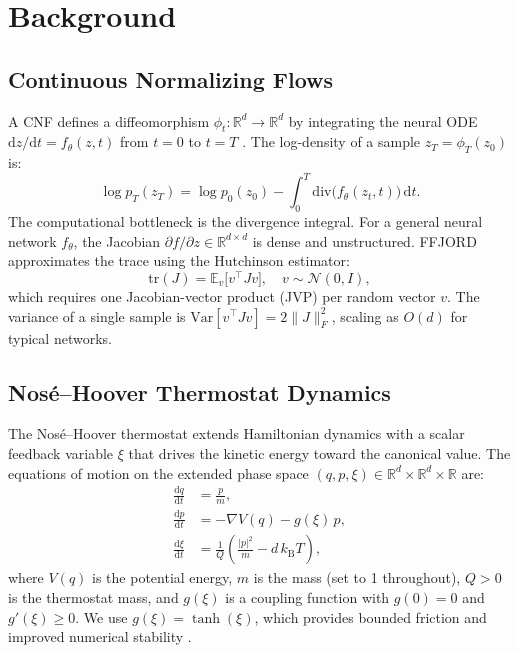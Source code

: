 \documentclass[11pt]{article}
\newcommand{\R}{\mathbb{R}}
\newcommand{\E}{\mathbb{E}}
\newcommand{\Var}{\mathrm{Var}}
\newcommand{\tr}{\mathrm{tr}}
\newcommand{\divergence}{\mathrm{div}}
\newcommand{\dd}{\mathrm{d}}
\newcommand{\kT}{k_{\mathrm{B}}T}
\begin{document}
\section{Background}
\label{sec:background}

\subsection{Continuous Normalizing Flows}
\label{sec:cnf_background}

A CNF defines a diffeomorphism $\phi_t : \R^d \to \R^d$ by integrating the
neural ODE $\dd z/\dd t = f_\theta(z, t)$ from $t=0$ to $t=T$
\citep{chen2018neural}. The log-density of a sample $z_T = \phi_T(z_0)$ is:
\begin{equation}
  \log p_T(z_T) = \log p_0(z_0)
    - \int_0^T \divergence\bigl(f_\theta(z_t, t)\bigr)\, \dd t.
  \label{eq:cnf_logp}
\end{equation}
The computational bottleneck is the divergence integral. For a general neural
network $f_\theta$, the Jacobian $\partial f / \partial z \in \R^{d \times d}$
is dense and unstructured. FFJORD \citep{grathwohl2019ffjord} approximates the
trace using the Hutchinson estimator:
\begin{equation}
  \tr(J) = \E_{v}\bigl[v^\top J v\bigr], \quad v \sim \mathcal{N}(0, I),
  \label{eq:hutchinson}
\end{equation}
which requires one Jacobian-vector product (JVP) per random vector $v$. The
variance of a single sample is $\Var[v^\top J v] = 2\|J\|_F^2$, scaling as
$O(d)$ for typical networks.

\subsection{Nos\'{e}--Hoover Thermostat Dynamics}
\label{sec:nh_background}

The Nos\'{e}--Hoover thermostat \citep{nose1984unified, hoover1985canonical}
extends Hamiltonian dynamics with a scalar feedback variable $\xi$ that drives
the kinetic energy toward the canonical value. The equations of motion on the
extended phase space $(q, p, \xi) \in \R^d \times \R^d \times \R$ are:
\begin{align}
  \frac{\dd q}{\dd t} &= \frac{p}{m}, \label{eq:nh_q} \\
  \frac{\dd p}{\dd t} &= -\nabla V(q) - g(\xi)\, p, \label{eq:nh_p} \\
  \frac{\dd \xi}{\dd t} &= \frac{1}{Q}\left(\frac{|p|^2}{m} - d\,\kT\right),
  \label{eq:nh_xi}
\end{align}
where $V(q)$ is the potential energy, $m$ is the mass (set to 1 throughout),
$Q > 0$ is the thermostat mass, and $g(\xi)$ is a coupling function with
$g(0) = 0$ and $g'(\xi) \geq 0$. We use $g(\xi) = \tanh(\xi)$, which provides
bounded friction and improved numerical stability \citep{ceriotti2010colored}.
\end{document}
